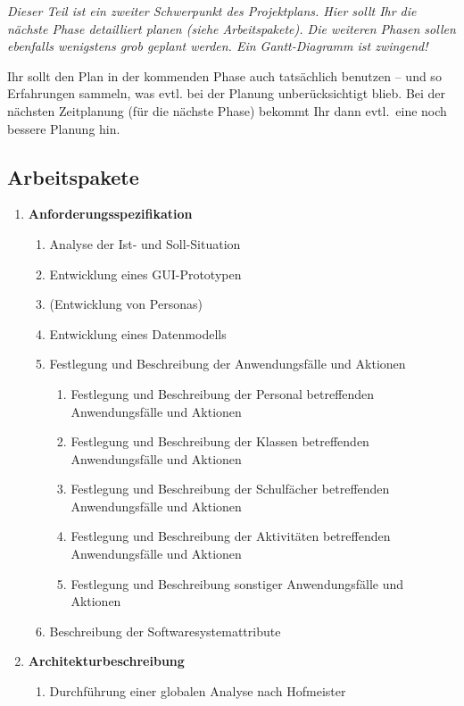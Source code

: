 \documentclass[fontsize=12pt,paper=a4,twoside]{scrartcl}
\begin{document}
{\em Dieser Teil ist ein zweiter Schwerpunkt des Projektplans. Hier sollt Ihr die nächste Phase detailliert planen (siehe Arbeitspakete). Die weiteren Phasen sollen ebenfalls wenigstens grob geplant werden. Ein Gantt-Diagramm ist zwingend! 

Ihr sollt den Plan in der kommenden Phase auch tatsächlich benutzen -- und so
  Erfahrungen sammeln, was evtl. bei der Planung unberücksichtigt
  blieb. Bei der nächsten Zeitplanung (für die nächste Phase) bekommt
  Ihr dann evtl.\ eine noch bessere Planung hin.}

\subsection{Arbeitspakete}\label{aps}


\begin{enumerate}
\item \textbf{Anforderungsspezifikation}
	\begin{enumerate}[label={(\arabic*)}]
	\item Analyse der Ist- und Soll-Situation
	\item Entwicklung eines GUI-Prototypen
	\item (Entwicklung von Personas)
	\item Entwicklung eines Datenmodells
	\item Festlegung und Beschreibung der Anwendungsfälle und Aktionen
		\begin{enumerate}[label={(\arabic*)}]
		\item Festlegung und Beschreibung der Personal betreffenden Anwendungsfälle und Aktionen
		\item Festlegung und Beschreibung der Klassen betreffenden Anwendungsfälle und Aktionen
		\item Festlegung und Beschreibung der Schulfächer betreffenden Anwendungsfälle und Aktionen
		\item Festlegung und Beschreibung der Aktivitäten betreffenden Anwendungsfälle und Aktionen
		\item Festlegung und Beschreibung sonstiger Anwendungsfälle und Aktionen
		\end{enumerate}
	\item Beschreibung der Softwaresystemattribute
	\end{enumerate}	
\item \textbf{Architekturbeschreibung}
	\begin{enumerate}[label={(\arabic*)}]
	\item Durchführung einer globalen Analyse nach Hofmeister

\end{enumerate}
\end{enumerate}
\end{document}
